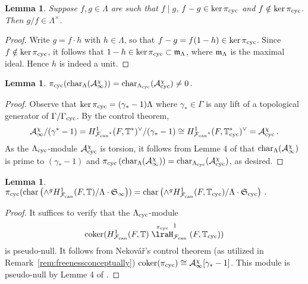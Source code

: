 \documentclass[12pt]{amsart}
\numberwithin{equation}{section}
\newtheorem{lemma}[thm]{Lemma}
\begin{document}
\begin{lemma}
\label{lem:equalitymodAimpliesequality}
Suppose $f,g \in {\Lambda}$ are such that $f \mid g$, $f - g \in \ker\pi_{\textup{cyc}}$ and $f\notin \ker\pi_{\textup{cyc}}$. Then $g/f\in {\Lambda}^\times$.
\end{lemma}
\begin{proof}
Write $g=f\cdot h$ with $h\in {\Lambda}$, so that $f-g=f(1-h) \in \ker\pi_{\textup{cyc}}$. Since $f\notin \ker\pi_{\textup{cyc}}$, it follows that $1-h \in \ker\pi_{\textup{cyc}} \subset \frak{m}_{\Lambda}$, where $\frak{m}_{\Lambda}$ is the maximal ideal. Hence $h$ is indeed a unit.
\end{proof}
\begin{lemma}
\label{lem:reductionstep1}
$\pi_{\textup{cyc}}({\textup{char}}_{\Lambda}(\mathcal{A}_\infty^\chi))={\textup{char}}_{{\Lambda}_{\textup{cyc}}}(\mathcal{A}_{\textup{cyc}}^\chi) \neq 0\,.$
\end{lemma}
\begin{proof}
Observe that $\ker\pi_{\textup{cyc}}=(\gamma_*-1){\Lambda}$ where $\gamma_*\in \Gamma$ is any lift of a topological generator of $\Gamma/\Gamma_{\textup{cyc}}$. By the control theorem, 
$$\mathcal{A}_\infty^\chi/(\gamma^*-1)=H^1_{{\mathcal{F}_{\textup{\lowercase{can}}}}^*}(F,{\mathbb{T}}^*)^\vee/(\gamma_*-1)\cong H^1_{{\mathcal{F}_{\textup{\lowercase{can}}}}^*}(F,{\mathbb{T}}_{\textup{cyc}}^*)^\vee=\mathcal{A}_{\textup{cyc}}^\chi\,.$$
As the ${\Lambda}_{\textup{cyc}}$-module $\mathcal{A}_{\textup{cyc}}^\chi$ is torsion, it follows from Lemme 4 of \cite[\S1.1.3]{PR84memoirs} that ${\textup{char}}_{\Lambda}(\mathcal{A}_\infty^\chi)$ is prime to 
$(\gamma_*-1)$ and $\pi_{\textup{cyc}}\left({\textup{char}}_{\Lambda}(\mathcal{A}_\infty^\chi)\right)={\textup{char}}_{{\Lambda}_{\textup{cyc}}}(\mathcal{A}_{\textup{cyc}}^\chi)$, as desired.
\end{proof}
\begin{lemma}
\label{lem:reductionstep2}
$\pi_{\textup{cyc}}({\textup{char}}\left(\wedge^g H^1_{\mathcal{F}_{\textup{\lowercase{can}}}}(F,{\mathbb{T}})/{\Lambda}\cdot\frak{S}_\infty\right))={\textup{char}}\left(\wedge^g H^1_{\mathcal{F}_{\textup{\lowercase{can}}}}(F,{\mathbb{T}}_{\textup{cyc}})/{\Lambda}\cdot\frak{S}_{\textup{cyc}}\right)\,.$
\end{lemma}
\begin{proof}
It suffices to verify that the ${\Lambda}_{\textup{cyc}}$-module 
$$\textup{coker}(H^1_{\mathcal{F}_{\textup{\lowercase{can}}}}(F,{\mathbb{T}})\stackrel{\pi_{\textup{cyc}}}\lraH^1_{\mathcal{F}_{\textup{\lowercase{can}}}}(F,{\mathbb{T}}_{\textup{cyc}}))$$ 
is pseudo-null. It follows from Nekov\'a\v{r}'s control theorem (as utilized in Remark~\ref{rem:freenessconceptually}) $\textup{coker}(\pi_{\textup{cyc}})\cong \mathcal{A}_\infty^\chi[\gamma_*-1]$. This module is pseudo-null by Lemme 4 of \cite[\S1.1.3]{PR84memoirs}.
\end{proof}
\end{document}
